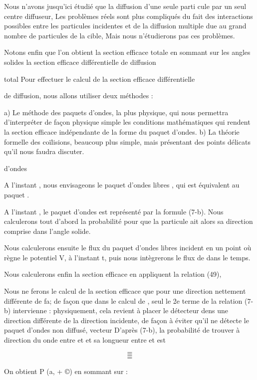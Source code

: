 Nous n'avons jusqu'ici étudié que la diffusion d'une seule parti
cule par un seul centre diffuseur, Les problèmes réels sont plus compliqués
du fait des interactions possibles entre les particules incidentes et de
la diffusion multiple due au grand nombre de particules de la cible, Mais
nous n'étudierons pas ces problèmes.

Notons enfin que l'on obtient la section efficace totale en sommant sur les angles
solides la section efficace différentielle de diffusion

total
Pour effectuer le calcul de la section efficace différentielle

de diffusion, nous allons utiliser deux méthodes :


a) Le méthode des paquets d'ondes, la plus physique, qui nous permettra
d'interpréter de façon physique simple les conditions mathématiques qui
rendent la section efficace indépendante de la forme du paquet d'ondes.
b) La théorie formelle des coïlisions, beaucoup plus simple, mais présentant des
points délicats qu'il nous faudra discuter.

d'ondes

A l'instant  , nous envisageons le paquet d'ondes libres , qui est équivalent au paquet .

A l'instant  , le paquet d'ondes est représenté par la
formule (7-b). Nous calculerons tout d'abord la probabilité 
pour que la particule ait alors sa direction comprise dans l'angle solide.

Nous calculerons ensuite le flux du paquet d'ondes libres incident en un point où
règne le potentiel V, à l'instant t, puis nous intègrerons le flux de  dans le temps.

Nous calculerons enfin la section efficace en appliquent la relation (49),

Nous ne ferons le calcul de la section efficace que pour une direction  nettement
différente de fa; de façon que dans le calcul de
, seul le 2e terme de la relation (7-b) intervienne : physiquement,
cela revient à placer le détecteur dens une direction différente de la direction
incidente, de façon à éviter qu'il ne détecte le paquet d'ondes non diffusé,
vecteur D'après (7-b), la probabilité de trouver à  direction du
onde entre  et  et sa longueur entre  et  est


\[
\tag{51}=
\]
\[
\tag{52}=
\]
\[
\tag{53}=
\]

On obtient P (a, + ©) en sommant sur  :

